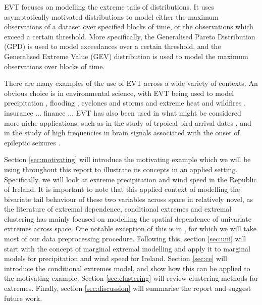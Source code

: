 \documentclass{article}
\numberwithin{equation}{section}
\begin{document}
EVT focuses on modelling the extreme tails of distributions.
It uses asymptotically motivated distributions to model either the maximum observations of a dataset over specified blocks of time, or the observations which exceed a certain threshold. 
More specifically, the Generalised Pareto Distribution (GPD) is used to model exceedances over a certain threshold, and the Generalised Extreme Value (GEV) distribution is used to model the maximum observations over blocks of time.


There are many examples of the use of EVT across a wide variety of contexts. 
An obvious choice is in environmental science, with EVT being used to model precipitation , flooding , cyclones and storms  and extreme heat and wildfires . 
insurance $\ldots$
finance $\ldots$
EVT has also been used in what might be considered more niche applications, such as in the study of trpoical bird arrival dates , and in the study of high frequencies in brain signals associated with the onset of epileptic seizures . 



Section \ref{sec:motivating} will introduce the motivating example which we will be using throughout this report to illustrate its concepts in an applied setting.
Specifically, we will look at extreme precipitation and wind speed in the Republic of Ireland. It is important to note that this applied context of modelling the bivariate tail behaviour of these two variables across space in relatively novel, as the literature of extremal dependence, conditional extremes and extremal clustering has mainly focused on modelling the spatial dependence of univariate extremes across space. One notable exception of this is in \cite{Vignotto2021}, for which we will take most of our data preprocessing procedure. 
Following this, section \ref{sec:uni} will start with the concept of marginal extremal modelling and apply it to marginal models for precipitation and wind speed for Ireland.
Section \ref{sec:ce} will introduce the conditional extremes model, and show how this can be applied to the motivating example. 
Section \ref{sec:clustering} will review clustering methods for extremes.
Finally, section \ref{sec:discussion} will summarise the report and suggest future work.
\end{document}
